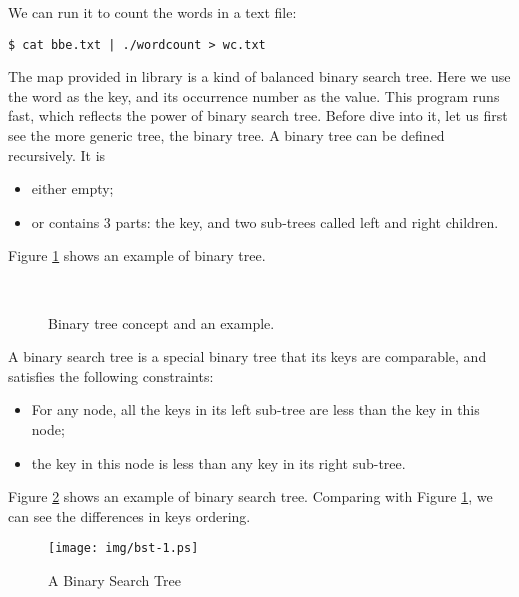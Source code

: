 \documentclass[b5paper]{article}
\begin{document}
We can run it to count the words in a text file:

\begin{verbatim}
$ cat bbe.txt | ./wordcount > wc.txt
\end{verbatim}

The map provided in library is a kind of balanced binary search tree. Here we use the word as the key, and its occurrence number as the value. This program runs fast, which reflects the power of binary search tree. Before dive into it, let us first see the more generic tree, the binary tree. A binary tree can be defined recursively. It is


\begin{itemize}
\item either empty;
\item or contains 3 parts: the key, and two sub-trees called left and right children.
\end{itemize}

Figure \ref{fig:binary-tree-example} shows an example of binary tree.

\begin{figure}[htbp]
  \centering
   \\
  \caption{Binary tree concept and an example.}
  \label{fig:binary-tree-example}
\end{figure}

A binary search tree is a special binary tree that its keys are comparable, and satisfies the following constraints:

\begin{itemize}
\item For any node, all the keys in its left sub-tree are less than the key in this node;
\item the key in this node is less than any key in its right sub-tree.
\end{itemize}

Figure \ref{fig:bst-example} shows an example of binary search tree. Comparing with Figure \ref{fig:binary-tree-example}, we can see the differences in keys ordering.

\begin{figure}[htbp]
       \begin{center}
        \texttt{[image: img/bst-1.ps]}
        \caption{A Binary Search Tree} \label{fig:bst-example}
       \end{center}
\end{figure}
\end{document}
